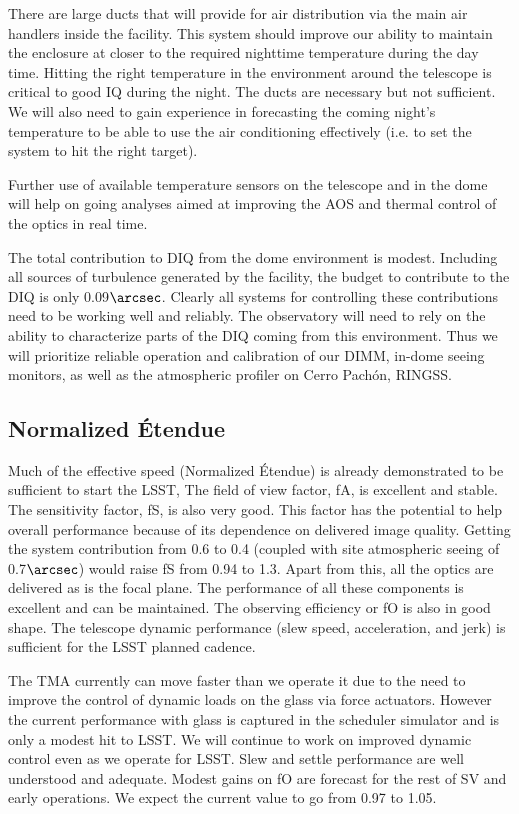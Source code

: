 There are large ducts that will provide for air distribution via the main air handlers inside the facility. This system should improve our ability to maintain the enclosure at closer to the required nighttime temperature during the day time. Hitting the right temperature in the environment around the telescope is critical to good IQ during the night. The ducts are necessary but not sufficient. We will also need to gain experience in forecasting the coming night's temperature to be able to use the air conditioning effectively (i.e. to set the system to hit the right target). 

Further use of available temperature sensors on the telescope and in the dome will help on going analyses aimed at improving the AOS and thermal control of the optics in real time. 

The total contribution to DIQ from the dome environment is modest. Including all sources of turbulence generated by the facility, the budget to contribute to the DIQ is only 0.09$\arcsec$. Clearly all systems for controlling these contributions need to be working well and reliably. The observatory will need to rely on the ability to characterize parts of the DIQ coming from this environment. Thus we will prioritize reliable operation and calibration of our DIMM, in-dome seeing monitors, as well as the atmospheric profiler on Cerro Pach\'{on}, RINGSS.  

\subsection{Normalized \'{E}tendue}
Much of the effective speed (Normalized  \'{E}tendue) is already demonstrated to be sufficient to start the LSST, The field of view factor, fA, is excellent and stable. The sensitivity factor, fS, is also very good. This factor has the potential to help overall performance because of its dependence on delivered image quality. Getting the system contribution from 0.6 to 0.4 (coupled with site atmospheric seeing of 0.7$\arcsec$) would raise fS from 0.94 to 1.3. Apart from this, all the optics are delivered as is the focal plane. The performance of all these components is excellent and can be maintained. The observing efficiency or fO is also in good shape. The telescope dynamic performance (slew speed, acceleration, and jerk) is sufficient for the LSST planned cadence. 

The TMA currently can move faster than we operate it due to the need to improve the control of dynamic loads on the glass via force actuators. However the current performance with glass is captured in the scheduler simulator and is only a modest hit to LSST. We will continue to work on improved dynamic control even as we operate for LSST. Slew and settle performance are well understood and adequate. Modest gains on fO are forecast for the rest of SV and early operations. We expect the current value to go from 0.97 to 1.05. 

